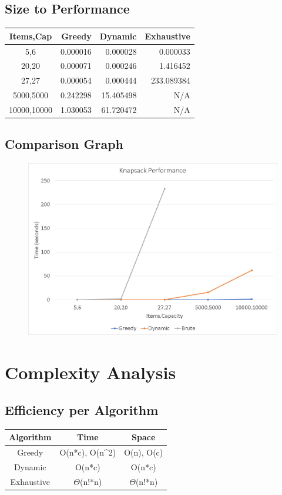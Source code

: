 \documentclass{article}
\begin{document}
\subsection{Size to Performance}
\begin{table}[H]
    \begin{tabular}{c r r r}
        Items,Cap & Greedy & Dynamic & Exhaustive \\ \hline
        5,6 & 0.000016 & 0.000028 & 0.000033 \\ 
        20,20 & 0.000071 & 0.000246 & 1.416452 \\
        27,27 & 0.000054 & 0.000444 & 233.089384 \\
        5000,5000 & 0.242298 & 15.405498 & N/A \\
        10000,10000 & 1.030053 & 61.720472 & N/A \\
    \end{tabular}
\end{table}

\subsection{Comparison Graph}
\begin{figure}[H]
    \centering
    \includegraphics[width=\textwidth]{knapGraph.jpg}
\end{figure}

\newpage
\section{Complexity Analysis}
\subsection{Efficiency per Algorithm}
\begin{table}[H]
    \begin{tabular}{c c c}
        Algorithm & Time & Space \\ \hline
        Greedy & O(n*c), O(n^2) & O(n), O(c) \\ 
        Dynamic & O(n*c) & O(n*c) \\
        Exhaustive & $\Theta$(n!*n) & $\Theta$(n!*n)\\
    \end{tabular}
\end{table}
\end{document}
